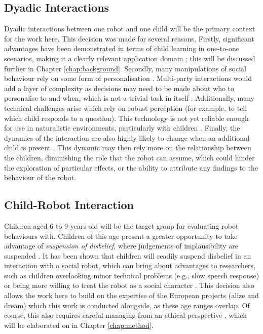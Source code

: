 \subsection{Dyadic Interactions} \label{sec:scope-dyad}
Dyadic interactions between one robot and one child will be the primary context for the work here. This decision was made for several reasons. Firstly, significant advantages have been demonstrated in terms of child \gls{learning} in one-to-one scenarios, making it a clearly relevant application domain \citep{bloom1984sigma,vanlehn2011relative}; this will be discussed further in Chapter \ref{chap:background}. Secondly, many manipulations of social behaviour rely on some form of personalisation \citep{belpaeme2012multimodal,syrdal2007personalized}. Multi-party interactions would add a layer of complexity as decisions may need to be made about who to personalise to and when, which is not a trivial task in itself \citep{leite2013managing}. Additionally, many technical challenges arise which rely on robust perception (for example, to tell which child responds to a question). This technology is not yet reliable enough for use in naturalistic environments, particularly with children \citep{belpaeme2013child}. Finally, the dynamics of the interaction are also highly likely to change when an additional child is present \citep{leite2015comparing}. This dynamic may then rely more on the relationship between the children, diminishing the role that the robot can assume, which could hinder the exploration of particular effects, or the ability to attribute any findings to the behaviour of the robot.

\subsection{Child-Robot Interaction} \label{sec:scope-cri}
Children aged 6 to 9 years old will be the target group for evaluating robot behaviours with. Children of this age present a greater opportunity to take advantage of \textit{suspension of disbelief}, where judgements of implausibility are suspended \citep{coleridge2004biographia,duffy2012suspension}. It has been shown that children will readily suspend disbelief in an interaction with a social robot, which can bring about advantages to researchers, such as children overlooking minor technical problems (e.g., slow speech response) or being more willing to treat the robot as a social character \citep{belpaeme2012multimodal,belpaeme2013child}. This decision also allows the work here to build on the expertise of the European projects (\acrshort{alize} and \acrshort{dream}) which this work is conducted alongside, as these age ranges overlap. Of course, this also requires careful managing from an ethical perspective \citep{kahn2004social,sharkey2015robot}, which will be elaborated on in Chapter \ref{chap:method}.

